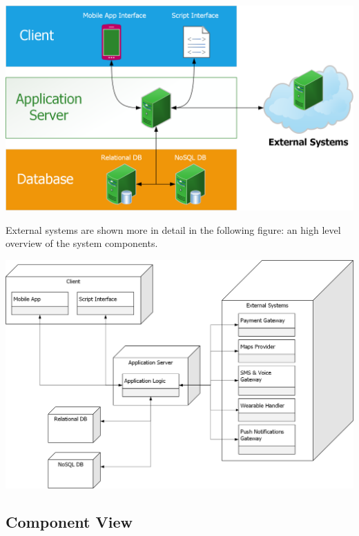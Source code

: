 \begin{center}
\includegraphics[scale=0.7]{sections/diagrams/layers.png}
\newline
{}
\end{center}

External systems are shown more in detail in the following figure: an high level overview of the system components.

\begin{center}
\includegraphics[scale=0.6]{sections/diagrams/highlevel.png}
\newline
{}
\end{center}

\subsection{Component View}
